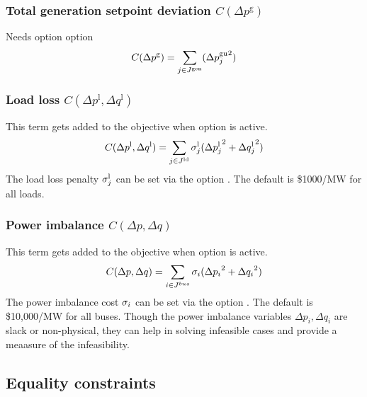 \subsubsection{Total generation setpoint deviation $C(\Delta p^{\text{g}})$}
Needs option \opflowoption{\opflowobjective}{\mingensetpointdeviation} option
\begin{equation}
C(\Delta p^{\text{g}}) = \sum_{j \in J^\text{gen}} ({\Delta{p}^\text{gu}_j}^2)
\label{eq:opf_obj_mingensetpointdev}
\end{equation}

\subsubsection{Load loss $C(\Delta p^{\text{l}},\Delta q^{\text{l}})$}
This term gets added to the objective when  \option{\opflowincludeloadloss} option is active. 
\begin{equation}
C(\Delta p^{\text{l}},\Delta q^{\text{l}}) =  \sum_{j \in J^\text{ld}} \sigma^\text{l}_j({\Delta{p}^{\text{l}}_j}^2 + {\Delta{q}^{\text{l}}_j}^2)
\label{eq:opf_obj_minloadloss}
\end{equation}
The load loss penalty $\sigma^\text{l}_j$ can be set via the option . The default is \$1000/MW for all loads.

\subsubsection{Power imbalance $C(\Delta p,\Delta q)$}
This term gets added to the objective when   option is active. 
\begin{equation}
C(\Delta p,\Delta q) =  \sum_{i \in J^{bus}} \sigma_i({\Delta p_i}^2 + {\Delta q_i}^2)
\label{eq:opf_obj_minpowerimbalance}
\end{equation}
The power imbalance cost $\sigma_i$ can be set via the option . The default is \$10,000/MW for all buses. Though the power imbalance variables $\Delta p_i,\Delta q_i$ are slack or non-physical, they can help in solving infeasible cases and provide a meaasure of the infeasibility. 

\subsection{Equality constraints}\label{sec:opflow_eq}

